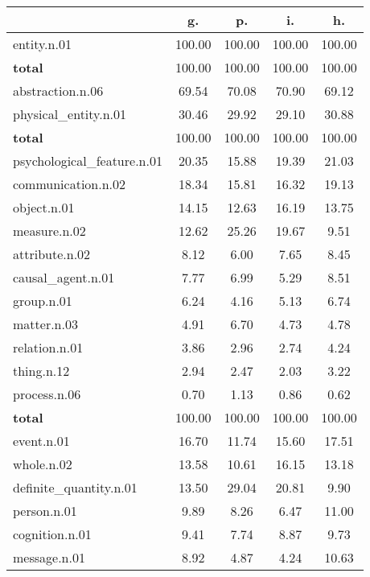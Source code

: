 \begin{table}[h!]
\begin{center}
\begin{tabular}{| l || c | c | c | c |}\hline
 & {\bf g.} & {\bf p.} & {\bf i.} & {\bf h.} \\\hline\hline
entity.n.01 & 100.00  & 100.00  & 100.00  & 100.00 \\\hline\hline
{{\bf total}} & 100.00  & 100.00  & 100.00  & 100.00 \\\hline\hline\hline
abstraction.n.06 & 69.54  & 70.08  & 70.90  & 69.12 \\\hline
physical\_entity.n.01 & 30.46  & 29.92  & 29.10  & 30.88 \\\hline\hline
{{\bf total}} & 100.00  & 100.00  & 100.00  & 100.00 \\\hline\hline\hline
psychological\_feature.n.01 & 20.35  & 15.88  & 19.39  & 21.03 \\\hline
communication.n.02 & 18.34  & 15.81  & 16.32  & 19.13 \\\hline
object.n.01 & 14.15  & 12.63  & 16.19  & 13.75 \\\hline
measure.n.02 & 12.62  & 25.26  & 19.67  & 9.51 \\\hline
attribute.n.02 & 8.12  & 6.00  & 7.65  & 8.45 \\\hline
causal\_agent.n.01 & 7.77  & 6.99  & 5.29  & 8.51 \\\hline
group.n.01 & 6.24  & 4.16  & 5.13  & 6.74 \\\hline
matter.n.03 & 4.91  & 6.70  & 4.73  & 4.78 \\\hline
relation.n.01 & 3.86  & 2.96  & 2.74  & 4.24 \\\hline
thing.n.12 & 2.94  & 2.47  & 2.03  & 3.22 \\\hline
process.n.06 & 0.70  & 1.13  & 0.86  & 0.62 \\\hline\hline
{{\bf total}} & 100.00  & 100.00  & 100.00  & 100.00 \\\hline\hline\hline
event.n.01 & 16.70  & 11.74  & 15.60  & 17.51 \\\hline
whole.n.02 & 13.58  & 10.61  & 16.15  & 13.18 \\\hline
definite\_quantity.n.01 & 13.50  & 29.04  & 20.81  & 9.90 \\\hline
person.n.01 & 9.89  & 8.26  & 6.47  & 11.00 \\\hline
cognition.n.01 & 9.41  & 7.74  & 8.87  & 9.73 \\\hline
message.n.01 & 8.92  & 4.87  & 4.24  & 10.63 \\\hline

\end{tabular}
\end{center}
\end{table}
